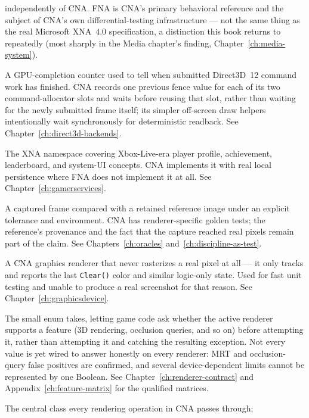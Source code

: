 \begin{description}
  independently of CNA. FNA is CNA's primary behavioral reference and the subject of CNA's
  own differential-testing infrastructure --- not the same thing as the real Microsoft
  XNA~4.0 specification, a distinction this book returns to repeatedly (most sharply in the
  Media chapter's  finding, Chapter~\ref{ch:media-system}).
\item[Fence (D3D12)] A GPU-completion counter used to tell when submitted Direct3D~12 command
  work has finished. CNA records one previous fence value for each of its two command-allocator
  slots and waits before reusing that slot, rather than waiting for the newly submitted frame
  itself; its simpler off-screen draw helpers intentionally wait synchronously for deterministic
  readback. See Chapter~\ref{ch:direct3d-backends}.
\item[GamerServices] The XNA namespace covering Xbox-Live-era player profile, achievement,
  leaderboard, and system-UI concepts. CNA implements it with real local persistence where
  FNA does not implement it at all. See Chapter~\ref{ch:gamerservices}.
\item[Golden-image test] A captured frame compared with a retained reference image under an
  explicit tolerance and environment. CNA has renderer-specific golden tests; the reference's
  provenance and the fact that the capture reached real pixels remain part of the claim. See
  Chapters~\ref{ch:oracles} and~\ref{ch:discipline-as-test}.
\item[HEADLESS] A CNA graphics renderer that never rasterizes a real pixel at all --- it only
  tracks and reports the last \texttt{Clear()} color and similar logic-only state. Used for
  fast unit testing and unable to produce a real screenshot for that reason. See
  Chapter~\ref{ch:graphicsdevice}.
\item[GraphicsCapability] The small enum  takes,
  letting game code ask whether the active renderer supports a feature (3D rendering,
  occlusion queries, and so on) before attempting it, rather than attempting it and catching
  the resulting exception. Not every value is yet wired to answer honestly on every renderer:
  MRT and occlusion-query false positives are confirmed, and several device-dependent limits
  cannot be represented by one Boolean. See Chapter~\ref{ch:renderer-contract} and
  Appendix~\ref{ch:feature-matrix} for the qualified matrices.
\item[GraphicsDevice] The central class every rendering operation in CNA passes through;

\end{description}

